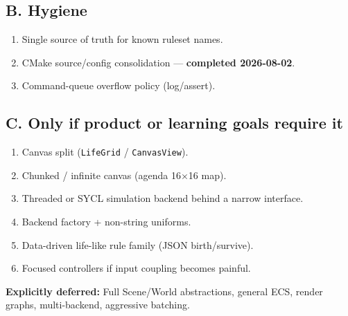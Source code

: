 \documentclass[10pt,a4paper]{article}
\begin{document}
\subsection{B. Hygiene}
\begin{enumerate}[resume]
    \item Single source of truth for known ruleset names.
    \item CMake source/config consolidation --- \textbf{completed 2026-08-02}.
    \item Command-queue overflow policy (log/assert).
\end{enumerate}

\subsection{C. Only if product or learning goals require it}
\begin{enumerate}[resume]
    \item Canvas split (\texttt{LifeGrid} / \texttt{CanvasView}).
    \item Chunked / infinite canvas (agenda 16$\times$16 map).
    \item Threaded or SYCL simulation backend behind a narrow interface.
    \item Backend factory + non-string uniforms.
    \item Data-driven life-like rule family (JSON birth/survive).
    \item Focused controllers if input coupling becomes painful.
\end{enumerate}

\noindent \textbf{Explicitly deferred:} Full Scene/World abstractions, general ECS, render graphs, multi-backend, aggressive batching.

\end{document}
